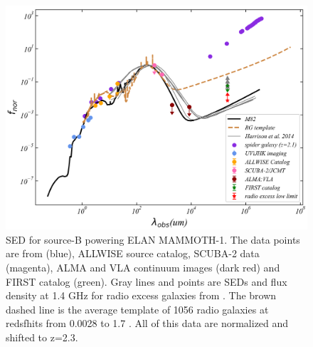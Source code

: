 \documentclass[../Results.tex]{subfiles}
\begin{document}
	\begin{figure}[htp]
		\centering
		\includegraphics[width=\columnwidth]{figs/SED_fitting}
		\caption{SED for source-B powering ELAN MAMMOTH-1. The data points are from \citet{cai2017discovery} (blue), ALLWISE source catalog, SCUBA-2 data \citep{arrigoni2018overdensity} (magenta), ALMA and VLA continuum images \citep{emonts2019cold} (dark red) and FIRST catalog (green). Gray lines and points are SEDs and flux density at 1.4 GHz for radio excess galaxies from \citet{harrison2014kiloparsec}. The brown dashed line is the average template of 1056 radio galaxies at redsfhits from 0.0028 to 1.7 \citep{Toba_2019}. All of this data are normalized and shifted to z=2.3.}
		\label{SED}
	\end{figure}
	
\end{document}
